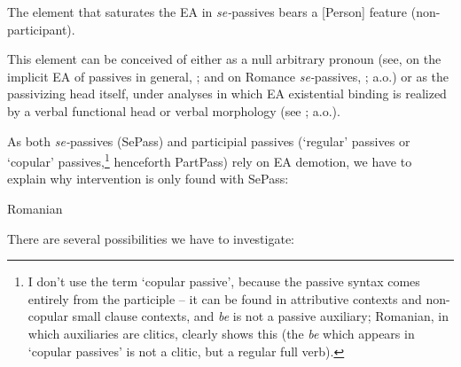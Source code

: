 \documentclass[output=paper]{langsci/langscibook}
\begin{document}
\ea%
    \label{ex:giurgea:26}
    The element that saturates the EA in \textit{se-}passives bears a [Person] feature (non-participant).
\z

This element can be conceived of either as a null arbitrary pronoun (see, on the implicit EA of passives in general, \citealt{Collins2005,Landau2010Explicit}; and on Romance \textit{se-}passives, \citealt{MacDonald2017}; a.o.) or as the passivizing head itself, under analyses in which EA existential binding is realized by a verbal functional head or verbal morphology (see \citealt{Baker1989Passive,Bruening2012}; a.o.).

As both \textit{se-}passives (SePass) and participial passives (‘regular' passives or ‘copular' passives,\footnote{I don’t use the term ‘copular passive', because the passive syntax comes entirely from the participle – it can be found in attributive contexts and non-copular small clause contexts, and \textit{be} is not a passive auxiliary; Romanian, in which auxiliaries are clitics, clearly shows this (the \textit{be} which appears in ‘copular passives' is not a clitic, but a regular full verb).} henceforth PartPass) rely on EA demotion, we have to explain why intervention is only found with SePass:

\ea%
    Romanian\label{ex:giurgea:27}\\
    \z
\z


There are several possibilities we have to investigate:
\end{document}
